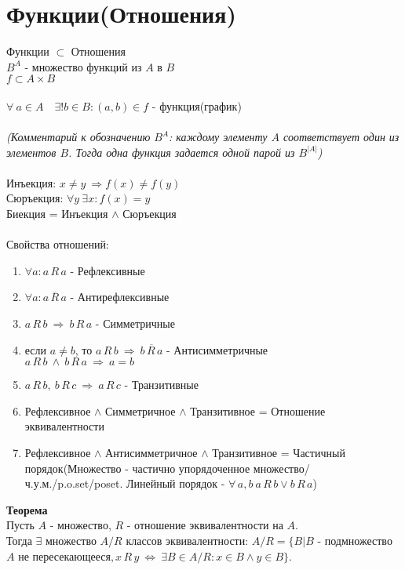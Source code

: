 \documentclass[12pt]{article}
\begin{document}
\section{Функции(Отношения)}
Функции $\subset$ Отношения\\
$B^A$ - множество функций из $A$ в $B$\\
$f \subset A \times B$\\\\
$\forall\ a \in A\quad\exists! b \in B: (a,b)\in f$ - функция(график)\\\\
\textit{(Комментарий к обозначению $B^A$: каждому элементу $A$ соответствует один из элементов $B$. Тогда одна функция задается одной парой из $B^{|A|}$)}\\\\
Инъекция: $x \neq y\ \Rightarrow f(x) \neq f(y)$\\
Сюръекция: $\forall y\ \exists x: f(x)=y$\\
Биекция = Инъекция $\land$ Сюръекция\\\\
Свойства отношений:
\begin{enumerate}
    \item $\forall a: a\,R\,a$ - Рефлексивные
    \item $\forall a: \overline{a\,R\,a}$ - Антирефлексивные
    \item $a\,R\,b\ \Rightarrow\ b\,R\,a$ - Симметричные
    \item если $a \neq b$, то $a\,R\,b\ \Rightarrow\ \overline{b\,R\,a}$ - Антисимметричные\\
    $a\,R\,b\ \land\ b\,R\,a\ \Rightarrow\ a=b$
    \item $a\,R\,b,\ b\,R\,c\ \Rightarrow\ a\,R\,c$ - Транзитивные
    \item Рефлексивное $\land$ Симметричное $\land$ Транзитивное = Отношение эквивалентности
    \item Рефлексивное $\land$ Антисимметричное $\land$ Транзитивное = Частичный порядок(Множество - частично упорядоченное множество/ч.у.м./p.o.set/poset. Линейный порядок - $\forall\,a,b\ a\,R\,b \lor b\,R\,a$)
\end{enumerate}
\textbf{Теорема}\\
Пусть $A$ - множество, $R$ - отношение эквивалентности на $A$.\\
Тогда $\exists$ множество $A/R$ классов эквивалентности: $A/R = \{ B | B$ - подмножество $A$ не пересекающееся$, x\,R\,y\ \Leftrightarrow\ \exists B \in A/R: x \in B \land y \in B\}$.\\\\
\end{document}
